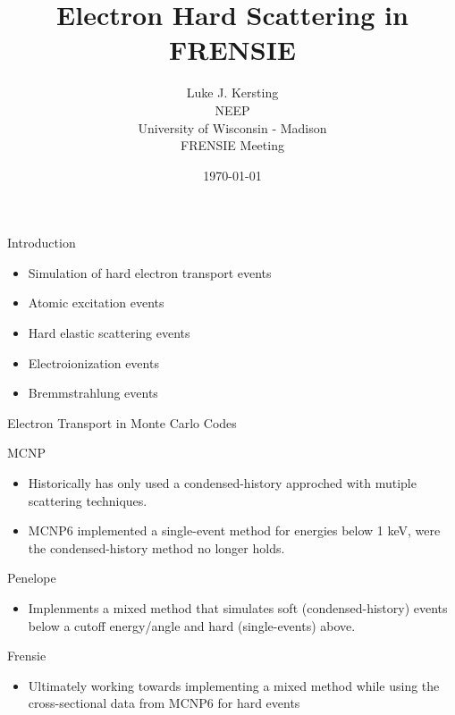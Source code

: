 \documentclass{beamer}
\author{Luke J. Kersting
    \\ NEEP
    \\ University of Wisconsin - Madison
    \\ FRENSIE Meeting
}
\date{\today}
\title{Electron Hard Scattering in FRENSIE}
\begin{document}
\maketitle

\begin{frame}{Introduction}

  \begin{itemize}
    \item Simulation of hard electron transport events
      \medskip
    \item Atomic excitation events
      \medskip
    \item Hard elastic scattering events
      \medskip
    \item Electroionization events
      \medskip
    \item Bremmstrahlung events
  \end{itemize}

\end{frame}

\begin{frame}{Electron Transport in Monte Carlo Codes}

  \begin{block}{MCNP}
    \begin{itemize}
      \item Historically has only used a condensed-history approched with mutiple scattering techniques.
      \item MCNP6 implemented a single-event method for energies below 1 keV, 
              were the condensed-history method no longer holds.
    \end{itemize}
  \end{block}
    
  \begin{block}{Penelope}
    \begin{itemize}
      \item Implenments a mixed method that simulates soft (condensed-history) 
              events below a cutoff energy/angle and hard (single-events) above.
    \end{itemize}    
  \end{block}

  \begin{block}{Frensie}
    \begin{itemize}
      \item Ultimately working towards implementing a mixed method while using 
              the cross-sectional data from MCNP6 for hard events 
    \end{itemize}    
  \end{block}
    

\end{frame}
\end{document}
